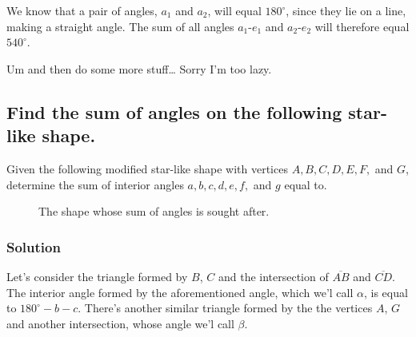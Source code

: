 \documentclass{article}
\newcommand{\solution}{\subsubsection*{\textcolor{MainColor}{Solution}}}
\theoremstyle{maintheorem}
\begin{document}
We know that a pair of angles, $a_1$ and $a_2$, will equal $180^\circ$, since they lie on a line, making a straight angle.
The sum of all angles $a_1$-$e_1$ and $a_2$-$e_2$ will therefore equal $540^\circ$.

Um and then do some more stuff\dots
Sorry I'm too lazy.

\subsection{
    Find the sum of angles on the following star-like shape.
}
Given the following modified star-like shape with vertices $A, B, C, D, E, F,$ and $G$,
determine the sum of interior angles $a, b, c, d, e, f,$ and $g$ equal to.

\begin{figure}[h]\label{starB}
    \centering

    \caption{The shape whose sum of angles is sought after.}
\end{figure}

\solution

Let's consider the triangle formed by $B$, $C$ and the intersection of $\overline{AB}$ and $\overline{CD}$.
The interior angle formed by the aforementioned angle, which we'l call $\alpha$, is equal to $180^\circ - b - c$.
There's another similar triangle formed by the the vertices $A$, $G$ and another intersection, whose angle we'l call $\beta$.
\end{document}
